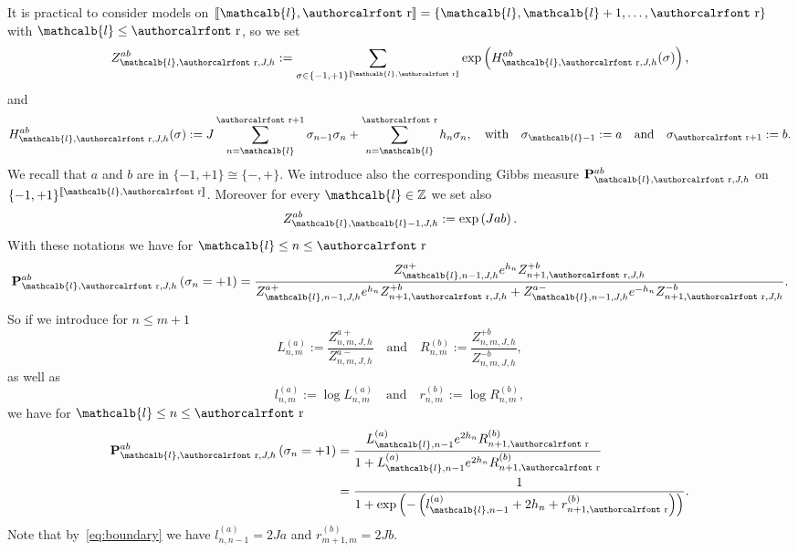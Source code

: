 \documentclass[10pt]{amsart}
\theoremstyle{definition}\newtheorem{defi}[theo]{Definition}\newtheorem{rema}[theo]{Remark}\newtheorem{exam}[theo]{Example}\newtheorem{exem}[theo]{Example}\newtheorem{nota}[theo]{Notation}
\newcommand{\mathcalc}[1]{\text{\authorcalrfont #1}}
\newcommand{\bP}{\mathbf{P}}
\newcommand{\bbZ}{\mathbb{Z}}
\newcommand{\gs}{\sigma}
\renewcommand{\ell}{\mathcalb{l}}
\newcommand{\err}{\mathcalc{r}}
\newcommand{\llbracket}{\mathopen{[\mkern -2.7mu[}}
\newcommand{\rrbracket}{\mathclose{]\mkern -2.7mu]}}
\newcommand{\lbra}{\llbracket}
\newcommand{\rbra}{\rrbracket}
\begin{document}
It is practical to consider models on $\lbra\ell, \err \rbra=\{\ell,\ell+1, \dots, \err\}$ with $\ell \le \err$, so we set
\begin{equation}\label{eq:defZellerr}
Z_{\ell, \err, J, h}^{ab}:= \sum_{\gs \in \{-1, +1\}^{\lbra\ell, \err \rbra}} \exp\left(H^{ab}_{\ell, \err, J, h} (\gs)\right),
\end{equation}
and
\begin{equation}\label{eq:defHellerr}
H^{ab}_{\ell, \err, J, h} (\gs):= J \sum_{n=\ell}^{\err+1} \gs_{n-1}\gs_n + \sum_{n=\ell}^\err h_n \gs_n, \quad \text{with}\quad \gs_{\ell-1}:=a \quad\text{and}\quad
\gs_{\err+1}:=b.
\end{equation}
We recall that $a$ and $b$ are in $\{-1, +1\} \cong \{ -, +\}$. We introduce also the corresponding Gibbs measure $\bP_{\ell, \err, J, h}^{ab}$ on $\{-1, +1\}^{\lbra\ell, \err \rbra}$. Moreover for every $\ell \in \bbZ$ we set also
\begin{equation}\label{eq:boundary}
Z_{\ell, \ell-1, J, h}^{ab}:= \exp\left(J ab\right).
\end{equation}
With these notations we have for $\ell \le n \le \err$
\begin{equation}
\bP_{\ell, \err, J, h}^{ab}\left(\gs_n=+1\right)=\frac{ {Z}_{\ell, n-1, J, h}^{a+} e^{h_n}{Z}_{n+1,\err, J, h}^{+b}} {{Z}_{\ell, n-1, J, h}^{a+} e^{h_n}{Z}_{n+1,\err, J, h}^{+b} +{Z}_{\ell, n-1, J, h}^{a-} e^{-h_n}{Z}_{n+1,\err, J, h}^{-b}}.
\end{equation}
So if we introduce for $n\le m+1$
\begin{equation}\label{eq:LaRb}
L^{(a)}_{n,m}:= \frac{ {Z}_{n, m, J, h}^{a+}}{ {Z}_{n, m, J, h}^{a-}}\quad\text{and} \quad R^{(b)}_{n,m}:= \frac{{Z}_{n,m, J,h}^{+b}}{ {Z}_{n,m, J, h}^{-b}},
\end{equation}
as well as
\begin{equation}
l^{(a)}_{n,m} := \log L_{n,m}^{(a)} \quad\text{and} \quad r^{(b)}_{n,m}:= \log R_{n,m}^{(b)},
\end{equation}
we have for $\ell\le n \le \err$
\begin{equation}\label{eq:Psigmaj}
\begin{aligned}
\bP^{ab}_{\ell, \err, J, h}\left(\gs_n=+1\right) &= \frac {L_{\ell,n-1}^{(a)} e^{2h_n} R_{n+1,\err}^{(b)}} {1+ L_{\ell,n-1}^{(a)} e^{2h_n} R_{n+1,\err}^{(b)}}\\
&=
\frac 1 {1+ \exp\left(-\left(l_{\ell,n-1}^{(a)} +2h_n+ r_{n+1, \err}^{(b)}\right)\right)}.
\end{aligned}
\end{equation}
Note that by~\eqref{eq:boundary} we have $l^{(a)}_{n,n-1}=2Ja$ and $r^{(b)}_{m+1,m}=2Jb$.
\end{document}
